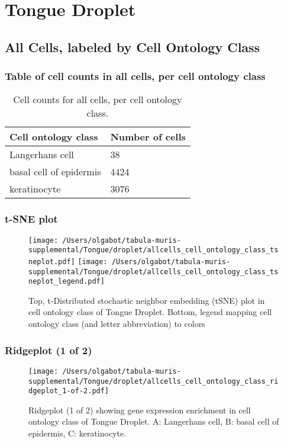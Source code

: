 \clearpage
\section{Tongue Droplet}

\subsection{All Cells, labeled by Cell Ontology Class}
\subsubsection{Table of cell counts in all cells, per cell ontology class}\begin{table}[h]
\centering
\label{my-label}
\begin{tabular}{@{}ll@{}}
\toprule

Cell ontology class& Number of cells \\ \midrule
Langerhans cell & 38 \\

basal cell of epidermis & 4424 \\

keratinocyte & 3076 \\
\bottomrule
\end{tabular}
\caption{Cell counts for all cells, per cell ontology class.}
\end{table}

\clearpage
\subsubsection{t-SNE plot}
\begin{figure}[h]
\centering
\texttt{[image: /Users/olgabot/tabula-muris-supplemental/Tongue/droplet/allcells\_cell\_ontology\_class\_tsneplot.pdf]}
\texttt{[image: /Users/olgabot/tabula-muris-supplemental/Tongue/droplet/allcells\_cell\_ontology\_class\_tsneplot\_legend.pdf]}
\caption{Top, t-Distributed stochastic neighbor embedding (tSNE) plot  in cell ontology class of Tongue Droplet. Bottom, legend mapping cell ontology class (and letter abbreviation) to colors}
\end{figure}


\clearpage
\clearpage
\subsubsection{Ridgeplot (1 of 2)}
\begin{figure}[h]
\centering
\texttt{[image: /Users/olgabot/tabula-muris-supplemental/Tongue/droplet/allcells\_cell\_ontology\_class\_ridgeplot\_1-of-2.pdf]}

\caption{ Ridgeplot (1 of 2)  showing gene expression enrichment in cell ontology class of Tongue Droplet. A: Langerhans cell, B: basal cell of epidermis, C: keratinocyte.}
\end{figure}


